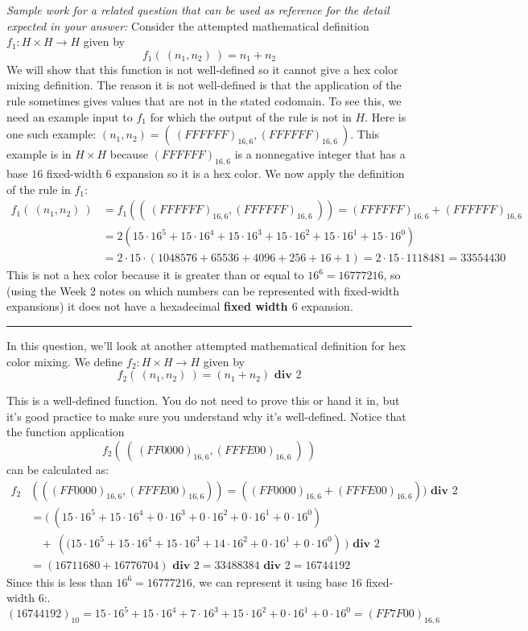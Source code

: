 \begin{enumerate}[labelindent=0pt, leftmargin=0pt]
\begin{enumerate}
{\it Sample work for a related question that can be used as reference for the detail expected 
in your answer:} Consider the attempted mathematical definition  $f_1: H\times H \to H$ given by
\[
f_1 (~(n_1, n_2) ~) = n_1 + n_2
\]
We will show that this function is not well-defined so it cannot give a hex color mixing definition. 
The reason it is not well-defined
is that the application of the rule sometimes gives values that are not in the stated codomain. 
To see this, we need an example input to $f_1$ for which the output of the rule is not in $H$.
Here is one such example: $(n_1, n_2) = (~(FFFFFF)_{16,6}, (FFFFFF)_{16,6}~)$. 
This example is in $H \times H$
because $(FFFFFF)_{16,6}$ is a nonnegative integer that has a base $16$ fixed-width $6$ expansion 
so it is a hex color.
We now apply the definition of the rule in $f_1$:
\begin{align*}
f_1 (~(n_1, n_2) ~) &=  f_1 ( (~(FFFFFF)_{16,6}, (FFFFFF)_{16,6}~) ) = (FFFFFF)_{16,6} + (FFFFFF)_{16,6} \\
&= 2 \left( 15\cdot 16^5 + 15\cdot 16^4 + 15 \cdot 16^3 + 15 \cdot 16^2 + 15 \cdot 16^1 + 15 \cdot 16^0 \right) \\
&= 2 \cdot 15 \cdot (1048576 + 65536 + 4096 + 256 + 16 + 1) = 2 \cdot 15 \cdot 1118481 = 33554430
\end{align*}
This is not a hex color because it is greater than or equal to $16^6 = 16777216$, 
so (using the Week 2 notes on which numbers can be represented
with fixed-width expansions) it does not have a hexadecimal {\bf fixed width $6$} expansion.

\rule{0.5\textwidth}{.4pt}

In this question, we'll look at another attempted mathematical definition for hex color mixing. 
We define $f_2: H\times H \to H$ given by
\[
f_2 (~(n_1, n_2) ~) = (n_1 + n_2) \textbf{ div } 2
\]

This is a well-defined function. You do not need to prove this or hand it in, but it's good practice to make 
sure you understand why it's well-defined. Notice that the function application 
\[
f_2 ( ~(~ (FF0000)_{16,6} , (FFFE00)_{16,6} ~)~)
\]
can be calculated as:
\begin{align*}
f_2&(((FF0000)_{16,6}, (FFFE00)_{16,6}))=
 ((FF0000)_{16,6} + (FFFE00)_{16,6})) \textbf{ div } 2\\
&= \big(~ \left(15\cdot16^5 + 15\cdot16^4 + 0\cdot16^3 + 0\cdot16^2 + 0\cdot16^1 + 0\cdot16^0 \right) \\
&~~~~+~
    \left((15\cdot16^5 + 15\cdot16^4 + 15\cdot16^3 + 14\cdot16^2 + 0\cdot16^1 + 0\cdot16^0\right )~\big )\textbf{ div } 2\\
&= (16711680 + 16776704) \textbf{ div } 2 = 33488384 \textbf{ div } 2 = 16744192
\end{align*}
Since this is less than $16^6 = 16777216$, we can represent it using base $16$ fixed-width $6$:.
$$(16744192)_{10} = 15\cdot16^5 + 15\cdot16^4 + 7\cdot16^3 + 15\cdot16^2 + 0\cdot16^1 + 0\cdot16^0 = (FF7F00)_{16,6}$$


\end{enumerate}
\end{enumerate}
